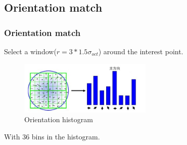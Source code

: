 \documentclass[notheorems, serif, table, compress]{beamer}  %
\begin{document}
\subsection{Orientation match}
\begin{frame}[fragile]
\frametitle{Orientation match}%


Select a window($r=3*1.5\sigma_{oct}$) around the interest point.

\begin{figure}[!ht]
  \centering\includegraphics[width=2.5in]{guanjiandian_fangxiang_zhifangtu.png}
  \caption{Orientation histogram}
 \label{fangxiang}
  \end{figure}

With 36 bins in the histogram.
\end{frame}
\end{document}
